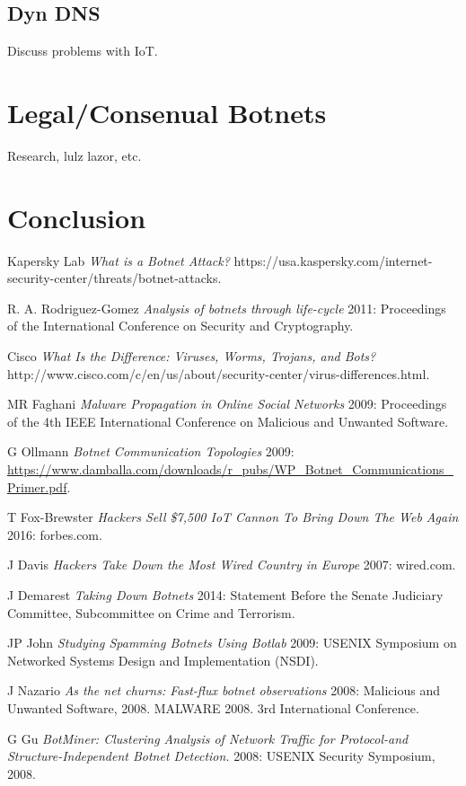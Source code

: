 \subsection{Dyn DNS}
Discuss problems with IoT.



\section{Legal/Consenual Botnets}
Research, lulz lazor, etc.

\section{Conclusion}

\pagebreak
\begin{thebibliography}{1}

   Kapersky Lab {\em What is a Botnet Attack?}  https://usa.kaspersky.com/internet-security-center/threats/botnet-attacks.

   R. A. Rodriguez-Gomez {\em Analysis of botnets through life-cycle} 2011:
  Proceedings of the International Conference on Security and Cryptography.

   Cisco {\em What Is the Difference: Viruses, Worms, Trojans, and Bots?}  http://www.cisco.com/c/en/us/about/security-center/virus-differences.html.

   MR Faghani {\em Malware Propagation in Online Social Networks} 2009:
  Proceedings of the 4th IEEE International Conference on Malicious and Unwanted Software.

   G Ollmann {\em Botnet Communication Topologies} 2009:
    \url{https://www.damballa.com/downloads/r_pubs/WP_Botnet_Communications_Primer.pdf}.

   T Fox-Brewster  {\em Hackers Sell \$7,500 IoT Cannon To Bring Down The Web Again} 2016:
    forbes.com.

   J Davis  {\em Hackers Take Down the Most Wired Country in Europe} 2007:
    wired.com.

   J Demarest {\em Taking Down Botnets} 2014:
    Statement Before the Senate Judiciary Committee, Subcommittee on Crime and Terrorism.

   JP John {\em Studying Spamming Botnets Using Botlab}  2009:
    USENIX Symposium on Networked Systems Design and Implementation (NSDI).

   J Nazario {\em As the net churns: Fast-flux botnet observations}  2008:
     Malicious and Unwanted Software, 2008. MALWARE 2008. 3rd International Conference.

   G Gu {\em BotMiner: Clustering Analysis of Network Traffic for Protocol-and Structure-Independent Botnet Detection.}  2008:
     USENIX Security Symposium, 2008.

\end{thebibliography}


